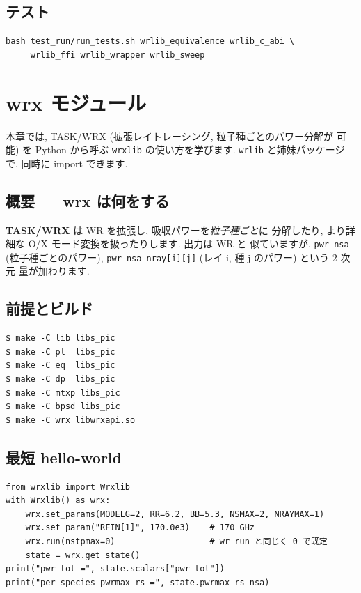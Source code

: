 \documentclass[11pt,a4paper]{report}
\begin{document}
\section{テスト}

\begin{lstlisting}[style=bash]
bash test_run/run_tests.sh wrlib_equivalence wrlib_c_abi \
     wrlib_ffi wrlib_wrapper wrlib_sweep
\end{lstlisting}

\clearpage
\chapter{wrx モジュール}
\label{ch:wrx}

\begin{learn}
本章では, TASK/WRX (拡張レイトレーシング, 粒子種ごとのパワー分解が
可能) を Python から呼ぶ \texttt{wrxlib} の使い方を学びます.
\texttt{wrlib} と姉妹パッケージで, 同時に import できます.
\end{learn}

\section{概要 — wrx は何をする}

\textbf{TASK/WRX} は WR を拡張し, 吸収パワーを\emph{粒子種ごと}に
分解したり, より詳細な O/X モード変換を扱ったりします. 出力は WR と
似ていますが, \texttt{pwr\_nsa} (粒子種ごとのパワー),
\texttt{pwr\_nsa\_nray[i][j]} (レイ i, 種 j のパワー) という 2 次元
量が加わります.

\section{前提とビルド}

\begin{lstlisting}[style=bash]
$ make -C lib libs_pic
$ make -C pl  libs_pic
$ make -C eq  libs_pic
$ make -C dp  libs_pic
$ make -C mtxp libs_pic
$ make -C bpsd libs_pic
$ make -C wrx libwrxapi.so
\end{lstlisting}

\section{最短 hello-world}

\begin{lstlisting}[style=py]
from wrxlib import Wrxlib
with Wrxlib() as wrx:
    wrx.set_params(MODELG=2, RR=6.2, BB=5.3, NSMAX=2, NRAYMAX=1)
    wrx.set_param("RFIN[1]", 170.0e3)    # 170 GHz
    wrx.run(nstpmax=0)                   # wr_run と同じく 0 で既定
    state = wrx.get_state()
print("pwr_tot =", state.scalars["pwr_tot"])
print("per-species pwrmax_rs =", state.pwrmax_rs_nsa)
\end{lstlisting}
\end{document}
